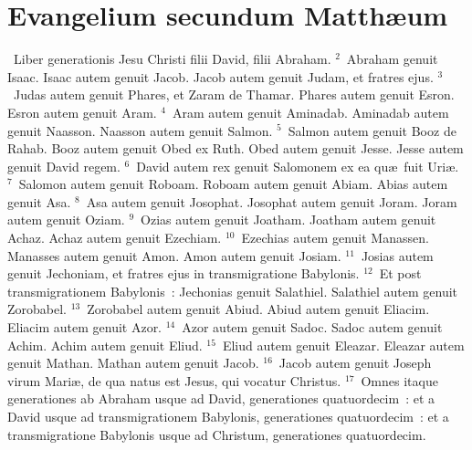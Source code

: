 \clearpage
{\centering \section*{Evangelium secundum Matthæum}}\thispagestyle{empty}

~Liber generationis Jesu Christi filii David, filii Abraham.
${}^{2}$~Abraham genuit Isaac. Isaac autem genuit Jacob. Jacob autem genuit Judam, et fratres ejus.
${}^{3}$~Judas autem genuit Phares, et Zaram de Thamar. Phares autem genuit Esron. Esron autem genuit Aram.
${}^{4}$~Aram autem genuit Aminadab. Aminadab autem genuit Naasson. Naasson autem genuit Salmon.
${}^{5}$~Salmon autem genuit Booz de Rahab. Booz autem genuit Obed ex Ruth. Obed autem genuit Jesse. Jesse autem genuit David regem.
${}^{6}$~David autem rex genuit Salomonem ex ea qu\ae\ fuit Uri\ae .
${}^{7}$~Salomon autem genuit Roboam. Roboam autem genuit Abiam. Abias autem genuit Asa.
${}^{8}$~Asa autem genuit Josophat. Josophat autem genuit Joram. Joram autem genuit Oziam.
${}^{9}$~Ozias autem genuit Joatham. Joatham autem genuit Achaz. Achaz autem genuit Ezechiam.
${}^{10}$~Ezechias autem genuit Manassen. Manasses autem genuit Amon. Amon autem genuit Josiam.
${}^{11}$~Josias autem genuit Jechoniam, et fratres ejus in transmigratione Babylonis.
${}^{12}$~Et post transmigrationem Babylonis~: Jechonias genuit Salathiel. Salathiel autem genuit Zorobabel.
${}^{13}$~Zorobabel autem genuit Abiud. Abiud autem genuit Eliacim. Eliacim autem genuit Azor.
${}^{14}$~Azor autem genuit Sadoc. Sadoc autem genuit Achim. Achim autem genuit Eliud.
${}^{15}$~Eliud autem genuit Eleazar. Eleazar autem genuit Mathan. Mathan autem genuit Jacob.
${}^{16}$~Jacob autem genuit Joseph virum Mari\ae , de qua natus est Jesus, qui vocatur Christus.
${}^{17}$~Omnes itaque generationes ab Abraham usque ad David, generationes quatuordecim~: et a David usque ad transmigrationem Babylonis, generationes quatuordecim~: et a transmigratione Babylonis usque ad Christum, generationes quatuordecim.


